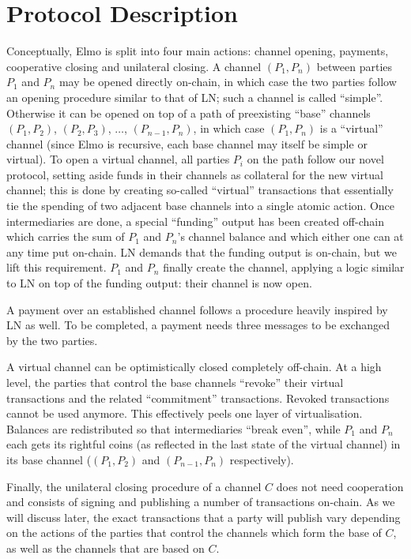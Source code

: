 \section{Protocol Description}
  Conceptually, Elmo is split into four main actions: channel opening,
  payments, cooperative closing and unilateral closing. A channel $(P_1, P_n)$
  between parties $P_1$ and $P_n$
  may be opened directly on-chain, in which case the two parties follow an
  opening procedure similar to that of LN; such a channel is called ``simple''.
  Otherwise it can be opened on top of a path
  of preexisting ``base'' channels $(P_1, P_2)$, $(P_2, P_3)$, $\dots$,
  $(P_{n-1}, P_{n})$, in which case $(P_1, P_n)$ is a ``virtual''
  channel (since Elmo is recursive, each base channel may itself be simple or
  virtual). To open a virtual
  channel, all parties $P_i$ on the
  path follow our novel protocol, setting aside funds in their channels as
  collateral for the new virtual channel; this is done
  by creating so-called ``virtual'' transactions that essentially
  tie the spending of two adjacent base channels into a single atomic action.
  Once intermediaries are done, a special ``funding'' output has been
  created off-chain which carries the sum of $P_1$ and $P_n$'s channel
  balance and which either one can at any time put on-chain. LN demands that the
  funding output is on-chain, but we lift this requirement. $P_1$ and $P_n$
  finally create the channel, applying a logic similar to LN on top of
  the funding output: their channel is now open.

  A payment over an established channel follows a procedure heavily inspired by
  LN as well. To be completed, a payment needs three messages to be exchanged by
  the two parties.

  A virtual channel can be optimistically closed completely off-chain. At a high
  level, the parties that control the base channels ``revoke'' their virtual
  transactions and the related ``commitment'' transactions. Revoked transactions
  cannot be used anymore. This effectively peels one layer of virtualisation.
  Balances are redistributed so that intermediaries ``break even'', while $P_1$
  and $P_n$ each gets its rightful coins (as reflected in the last state of the
  virtual channel) in its base channel ($(P_1, P_2)$ and $(P_{n-1}, P_n)$
  respectively).

  Finally, the unilateral closing procedure of a channel $C$ does not need
  cooperation and consists of signing and publishing a number of transactions
  on-chain. As
  we will discuss later, the exact transactions that a party will publish vary
  depending on the actions of the parties that control the channels which form
  the base of $C$, as well as the channels that are based on $C$.


